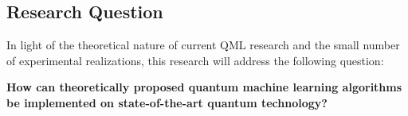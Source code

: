 \documentclass[a4paper]{article}
\newcommand*{\0}{$\ket{0}$}
\newcommand*{\1}{$\ket{1}$}
\begin{document}



\subsection{Research Question}
\label{subsec:researchquestion}

In light of the theoretical nature of current QML research and the small number of experimental realizations, this research will address the following question:
 
\centering\textbf{How can theoretically proposed quantum machine learning algorithms be implemented on state-of-the-art quantum technology?}
\end{document}
